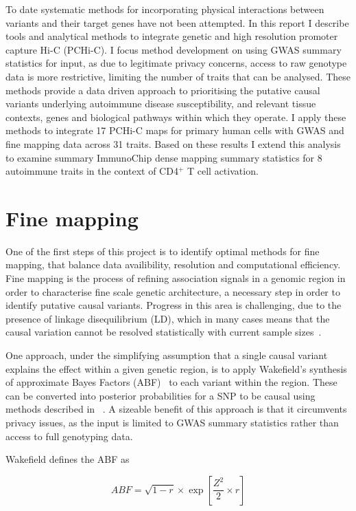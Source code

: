 \documentclass[a4paper,11pt]{report}
\begin{document}
To date systematic methods for incorporating physical interactions between variants and their target genes have not been attempted. In this report I describe tools and analytical methods to integrate genetic and high resolution promoter capture Hi-C (PCHi-C). I focus method development on using GWAS summary statistics for input, as due to legitimate privacy concerns, access to raw genotype data is more restrictive, limiting the number of traits that can be analysed. These methods provide a data driven approach to prioritising the putative causal variants underlying autoimmune disease susceptibility, and  relevant tissue contexts, genes and biological pathways within which they operate. I apply these methods to integrate 17 PCHi-C maps for primary human cells with GWAS and fine mapping data across 31 traits. Based on these results I extend this analysis to examine summary ImmunoChip dense mapping summary statistics for 8 autoimmune traits in the context of CD4${^+}$ T cell activation.

\section{Fine mapping}
\label{sect:finemapping}
One of the first steps of this project is to identify optimal methods for fine mapping, that balance data availibility, resolution and computational efficiency. Fine mapping is the process of refining association signals in a genomic region in order to characterise fine scale genetic architecture, a necessary step in order to identify putative causal variants. Progress in this area is challenging, due to the presence of linkage disequilibrium (LD), which in many cases means that the causal variation cannot be resolved statistically with current sample sizes~\citep{LiKellis2016}. 

 One approach, under the simplifying assumption that a single causal variant explains the effect within a given genetic region, is to apply Wakefield's synthesis of approximate Bayes Factors (ABF)~\citep{Wakefield2009} to each variant within the region. These can be converted into posterior probabilities for a SNP to be causal using methods described in ~\citet{The_Wellcome_Trust_Case_Control_Consortium2012-ad}. A sizeable benefit of this approach is that it circumvents privacy issues, as the input is limited to GWAS summary statistics rather than access to full genotyping data.

Wakefield defines the ABF as

\begin{equation}
	ABF =  \sqrt{1 - r} \times \exp{\left[\frac{Z^{2}}{2} \times r\right]}
\end{equation}
\end{document}
